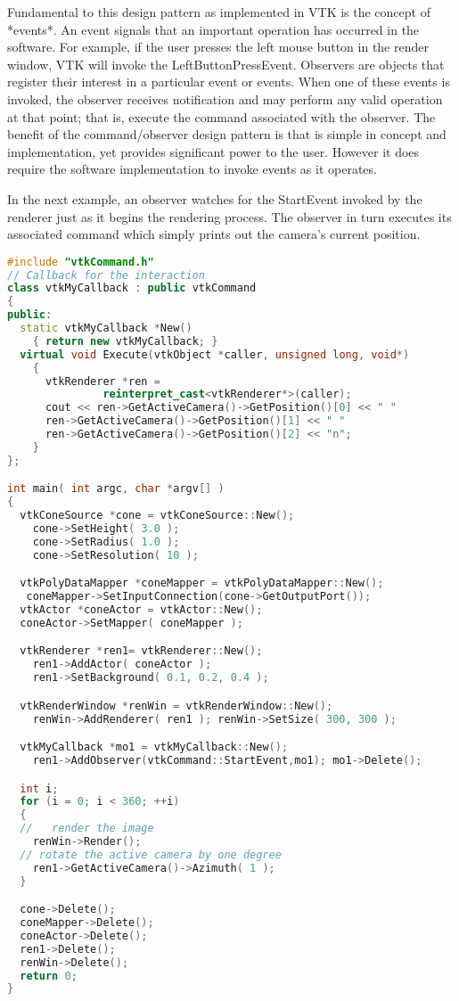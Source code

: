 Fundamental to this design pattern as implemented in VTK is the concept of *events*. An event signals that an important operation has occurred in the software. For example, if the user presses the left mouse button in the render window, VTK will invoke the LeftButtonPressEvent. Observers are objects that register their interest in a particular event or events. When one of these events is invoked, the observer receives notification and may perform any valid operation at that point; that is, execute the command associated with the observer. The benefit of the command/observer design pattern is that is simple in concept and implementation, yet provides significant power to the user. However it does require the software implementation to invoke events as it operates.

In the next example, an observer watches for the StartEvent invoked by the renderer just as it begins the rendering process. The observer in turn executes its associated command which simply prints out the camera's current position.

\begin{lstlisting}[language=C++, caption={}]
#include "vtkCommand.h"
// Callback for the interaction
class vtkMyCallback : public vtkCommand
{
public:
  static vtkMyCallback *New()
    { return new vtkMyCallback; }
  virtual void Execute(vtkObject *caller, unsigned long, void*)
    {
      vtkRenderer *ren =
               reinterpret_cast<vtkRenderer*>(caller);
      cout << ren->GetActiveCamera()->GetPosition()[0] << " "
      ren->GetActiveCamera()->GetPosition()[1] << " "
      ren->GetActiveCamera()->GetPosition()[2] << "n";
    }
};

int main( int argc, char *argv[] )
{
  vtkConeSource *cone = vtkConeSource::New();
    cone->SetHeight( 3.0 );
    cone->SetRadius( 1.0 );
    cone->SetResolution( 10 );

  vtkPolyDataMapper *coneMapper = vtkPolyDataMapper::New();
   coneMapper->SetInputConnection(cone->GetOutputPort());
  vtkActor *coneActor = vtkActor::New();
  coneActor->SetMapper( coneMapper );

  vtkRenderer *ren1= vtkRenderer::New();
    ren1->AddActor( coneActor );
    ren1->SetBackground( 0.1, 0.2, 0.4 );

  vtkRenderWindow *renWin = vtkRenderWindow::New();
    renWin->AddRenderer( ren1 ); renWin->SetSize( 300, 300 );

  vtkMyCallback *mo1 = vtkMyCallback::New();
    ren1->AddObserver(vtkCommand::StartEvent,mo1); mo1->Delete();

  int i;
  for (i = 0; i < 360; ++i)
  {
  //   render the image
    renWin->Render();
  // rotate the active camera by one degree
    ren1->GetActiveCamera()->Azimuth( 1 );
  }

  cone->Delete();
  coneMapper->Delete();
  coneActor->Delete();
  ren1->Delete();
  renWin->Delete();
  return 0;
}
\end{lstlisting}


